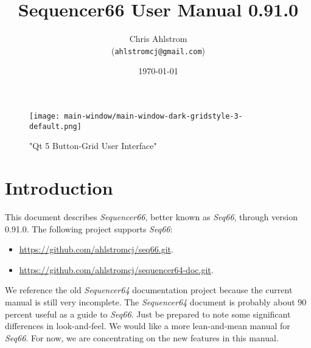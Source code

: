 \documentclass[
 11pt,
 twoside,
 a4paper,
 headinclude,
 footinclude,
 final                                 %
]{article}
\begin{document}
\title{Sequencer66 User Manual 0.91.0}
\author{Chris Ahlstrom \\
   (\texttt{ahlstromcj@gmail.com})}
\date{\today}
\maketitle


\begin{figure}[H]
   \centering 
   \texttt{[image: main-window/main-window-dark-gridstyle-3-default.png]}
   \caption*{"Qt 5 Button-Grid User Interface"}
\end{figure}

\clearpage                             %

\tableofcontents
\listoffigures                         %
\listoftables                          %


\setlength{\parindent}{2em}
\setlength{\parskip}{1ex plus 0.5ex minus 0.2ex}

\section{Introduction}
\label{sec:introduction}

   This document describes \textsl{Sequencer66}, better known as
   \textsl{Seq66},
   through version 0.91.0.
   The following project supports \textsl{Seq66}:

   \begin{itemize}
      \item \url{https://github.com/ahlstromcj/seq66.git}.
      \item \url{https://github.com/ahlstromcj/sequencer64-doc.git}.
   \end{itemize}

   We reference the old \textsl{Sequencer64} documentation project because
   the current manual is still very incomplete.  The \textsl{Sequencer64}
   document is probably about 90 percent useful as a guide to \textsl{Seq66}.
   Just be prepared to note some significant differences in look-and-feel.
   We would like a more lean-and-mean manual for \textsl{Seq66}.
   For now, we are concentrating on the new features in this manual.
\end{document}
